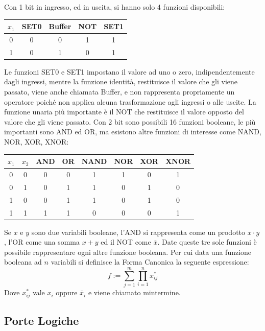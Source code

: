 \documentclass{article}
\numberwithin{equation}{subsection}
\begin{document}
Con 1 bit in ingresso, ed in uscita, si hanno solo 4 funzioni disponibili: 
\begin{center}
    \begin{tabular}{|c||c|c|c|c|}
        \hline
        $x_1$&SET0&Buffer&NOT&SET1\\
        \hline\hline
        0&0&0&1&1\\
        \hline
        1&0&1&0&1\\
        \hline
    \end{tabular}
\end{center}
Le funzioni SET0 e SET1 impostano il valore ad uno o zero, indipendentemente dagli ingressi, mentre la funzione identità, restituisce il valore che gli viene passato, viene anche chiamata Buffer, e non 
rappresenta propriamente un operatore poiché non applica alcuna trasformazione agli ingressi o alle uscite. La funzione unaria più importante è il 
NOT che restituisce il valore opposto del valore che gli viene passato. 
Con 2 bit sono possibili 16 funzioni booleane, le più importanti sono AND ed OR, ma esistono altre funzioni di interesse come NAND, NOR, XOR, XNOR:
\begin{center}
    \begin{tabular}{|c|c||c|c|c|c|c|c|}
        \hline
        $x_1$&$x_2$&AND&OR&NAND&NOR&XOR&XNOR\\
        \hline\hline
        0&0&0&0&1&1&0&1\\
        \hline
        0&1&0&1&1&0&1&0\\
        \hline
        1&0&0&1&1&0&1&0\\
        \hline
        1&1&1&1&0&0&0&1\\
        \hline
    \end{tabular}
\end{center}

Se $x$ e $y$ sono due variabili booleane, l'AND si rappresenta come un prodotto $x\cdot y$, l'OR come una somma $x+y$ ed il NOT come $\bar{x}$. Date queste tre sole funzioni è possibile rappresentare ogni altre 
funzione booleana. Per cui data una funzione booleana ad $n$ variabili si definisce la Forma Canonica la seguente espressione:
\begin{equation}
    f:=\sum_{j=1}^m\prod_{i=1}^nx_{ij}^*
\end{equation}
Dove $x_{ij}^*$ vale $x_i$ oppure $\bar{x}_i$ e viene chiamato mintermine. 

\subsection{Porte Logiche}
\end{document}
